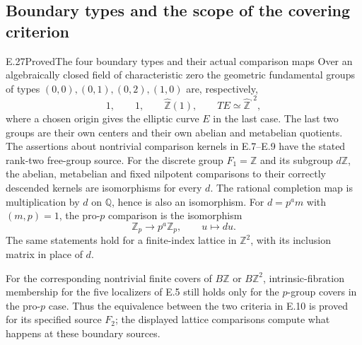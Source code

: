 \subsection{Boundary types and the scope of the covering criterion}

\begin{statement}{E.27}{Proved}{The four boundary types and their actual comparison maps}
Over an algebraically closed field of characteristic zero the geometric
fundamental groups of types $(0,0),(0,1),(0,2),(1,0)$ are, respectively,
\[
 1,\qquad1,\qquad\widehat{\mathbb Z}(1),\qquad
 T E\simeq\widehat{\mathbb Z}^{,2},
\]
where a chosen origin gives the elliptic curve $E$ in the last case.
The last two groups are their own centers and their own abelian and
metabelian quotients. The assertions about nontrivial comparison kernels
in E.7--E.9 have the stated rank-two free-group source. For the discrete
group $F_1=\mathbb Z$ and its subgroup $d\mathbb Z$, the abelian,
metabelian and fixed nilpotent comparisons to their correctly descended
kernels are isomorphisms for every $d$. The rational completion map
is multiplication by $d$ on $\mathbb Q$, hence is also an isomorphism.
For $d=p^a m$ with $(m,p)=1$, the pro-$p$ comparison is the isomorphism
\[
 \mathbb Z_p\longrightarrow p^a\mathbb Z_p,\qquad u\longmapsto du.
\]
The same statements hold for a finite-index lattice in $\mathbb Z^2$,
with its inclusion matrix in place of $d$.

For the corresponding nontrivial finite covers of $B\mathbb Z$ or
$B\mathbb Z^2$, intrinsic-fibration membership for the five localizers
of E.5 still holds only for the $p$-group covers in the pro-$p$ case.
Thus the equivalence between the two criteria in E.10 is proved for its
specified source $F_2$; the displayed lattice comparisons compute what
happens at these boundary sources.
\end{statement}
